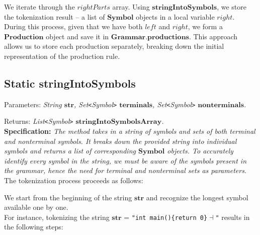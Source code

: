 We iterate through the \(rightParts\) array. Using \(\boldsymbol{stringIntoSymbols}\), we store the tokenization result – a list of \(\boldsymbol{Symbol}\) objects in a local variable \(right\). During this process, given that we have both \(left\) and \(right\), we form a \(\boldsymbol{Production}\) object and save it in \(\boldsymbol{Grammar.productions}\). This approach allows us to store each production separately, breaking down the initial representation of the production rule.

\vspace{30pt}

\subsection{Static stringIntoSymbols}

Parameters: \textit{String \(\boldsymbol{str}\), Set\texttt{<}Symbol\texttt{>} \(\boldsymbol{terminals}\), Set\texttt{<}Symbol\texttt{>} \(\boldsymbol{nonterminals}\).}

Returns: \textit{ List\texttt{<}Symbol\texttt{>} \(\boldsymbol{stringIntoSymbolsArray}\).}\\

\textbf{Specification:} \textit{The method takes in a string of symbols and sets of both terminal and nonterminal symbols. It breaks down the provided string into individual symbols and returns a list of corresponding \(\boldsymbol{Symbol}\) objects. To accurately identify every symbol in the string, we must be aware of the symbols present in the grammar, hence the need for terminal and nonterminal sets as parameters.}\\

The tokenization process proceeds as follows:

We start from the beginning of the string \(\boldsymbol{str}\) and recognize the longest symbol available one by one.\\

For instance, tokenizing the string \(\boldsymbol{str}\) = \texttt{"int main()\{return 0\}\( \dashv \)"} results in the following steps:

